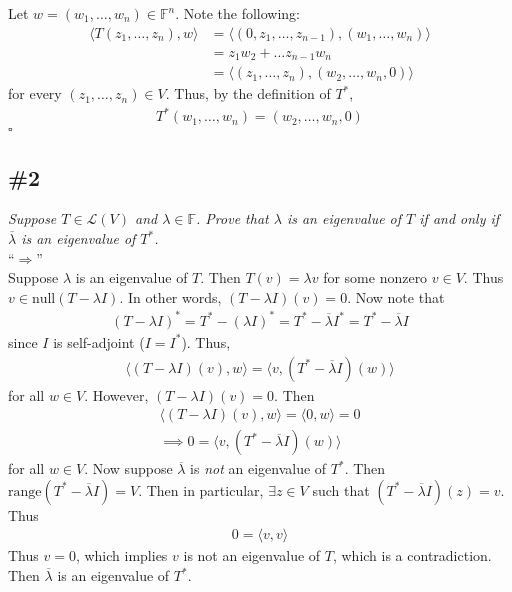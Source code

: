 \documentclass[12pt]{article}
\newcommand{\VECTOR}[1]{\langle #1 \rangle}
\begin{document}
\noindent Let $w = (w_1, \dots, w_n) \in \mathbb{F}^n$.  Note the following:
\begin{align*}
	\VECTOR{T(z_1, \dots, z_n), w} &= \VECTOR{(0, z_1, \dots, z_{n-1}), (w_1, \dots, w_n)} \\
	&= z_1w_2 + \dots z_{n-1}w_n \\
	&= \VECTOR{(z_1, \dots, z_n), (w_2, \dots, w_n, 0)}
\end{align*}
for every $(z_1, \dots, z_n) \in V$.  Thus, by the definition of $T^*$,
\begin{align*}
	T^*(w_1, \dots, w_n) = (w_2, \dots, w_n, 0)
\end{align*}
\hfill $\square$

\subsection*{\#2}
{\it Suppose $T \in \mathcal{L}(V)$ and $\lambda \in \mathbb{F}$.  Prove that $\lambda$ is an eigenvalue of $T$ if and only if $\overline{\lambda}$ is an eigenvalue of $T^*$.} \\

\noindent ``$\Longrightarrow$'' \\
Suppose $\lambda$ is an eigenvalue of $T$.  Then $T(v) = \lambda v$ for some nonzero $v \in V$.  Thus $v \in \text{null}(T - \lambda I)$.  In other words, $(T - \lambda I)(v) = 0$.  Now note that
\begin{align*}
	(T - \lambda I)^* = T^* - (\lambda I)^* = T^* - \overline{\lambda}I^* = T^* - \overline{\lambda}I
\end{align*}
since $I$ is self-adjoint ($I = I^*$).  Thus,
\begin{align*}
	\VECTOR{(T - \lambda I)(v), w} = \VECTOR{v, (T^* - \overline{\lambda}I)(w)}
\end{align*}
for all $w \in V$.  However, $(T - \lambda I)(v) = 0$.  Then
\begin{align*}
	\VECTOR{(T - \lambda I)(v), w} = \VECTOR{0, w} = 0 \\
	\implies 0 = \VECTOR{v, (T^* - \overline{\lambda}I)(w)}
\end{align*}
for all $w \in V$.  Now suppose $\overline{\lambda}$ is {\it not} an eigenvalue of $T^*$.  Then $\text{range}(T^* - \overline{\lambda}I) = V$.  Then in particular, $\exists z \in V$ such that $(T^* - \overline{\lambda}I)(z) = v$.  Thus
\begin{align*}
	0 = \VECTOR{v, v}
\end{align*}
Thus $v = 0$, which implies $v$ is not an eigenvalue of $T$, which is a contradiction.  Then $\overline{\lambda}$ is an eigenvalue of $T^*$. \\
\end{document}

